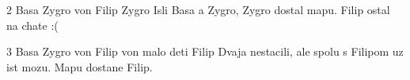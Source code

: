 








 2
Basa
Zygro
von
Filip
\vystup
Zygro
\komentar
Isli Basa a Zygro, Zygro dostal mapu.
Filip ostal na chate :(
\koniec

 3
Basa
Zygro
von
Filip
von
\vystup
malo deti
Filip
\komentar
Dvaja nestacili, ale spolu s Filipom uz ist mozu. Mapu dostane Filip.
\koniec



